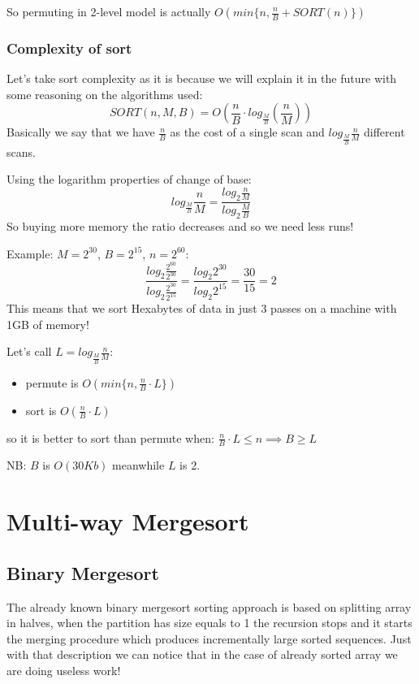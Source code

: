 So permuting in 2-level model is actually $O(min\{n, \frac{n}{B} + SORT(n)\})$

\subsubsection{Complexity of sort}
Let's take sort complexity as it is because we will explain it in the future with some reasoning on the algorithms used:
$$
    SORT(n, M, B) = O\left( \frac{n}{B} \cdot log_{\frac{M}{B}} \left( \frac{n}{M} \right) \right) 
$$
Basically we say that we have $\frac{n}{B}$ as the cost of a single scan and $log_{\frac{M}{B}} \frac{n}{M}$ different scans.

Using the logarithm properties of change of base:
$$
    log_{\frac{M}{B}} \frac{n}{M} = \frac{log_2\frac{n}{M}}{log_2 \frac{M}{B}}
$$
So buying more memory the ratio decreases and so we need less runs!

Example: $M=2^{30}$, $B=2^{15}$, $n=2^{60}$:
$$
    \frac{log_2 \frac{2^{60}}{2^{30}}}{log_2 \frac{2^30}{2^15}} = \frac{log_2 2^{30}}{log_2 2^{15}} = \frac{30}{15} = 2
$$
This means that we sort Hexabytes of data in just 3 passes on a machine with 1GB of memory!

Let's call $L=log_{\frac{M}{B}} \frac{n}{M}$:
\begin{itemize}
    \item permute is $O\left(min\{n, \frac{n}{B} \cdot L \}\right)$
    \item sort is $O\left( \frac{n}{B} \cdot L \right)$
\end{itemize}
so it is better to sort than permute when: $\frac{n}{B} \cdot L \leq n \implies B \geq L$

NB: $B$ is $O(30Kb)$ meanwhile $L$ is 2.

\section{Multi-way Mergesort}
\subsection{Binary Mergesort}
The already known binary mergesort sorting approach is based on splitting array in halves, when the partition has size equals to 1 the recursion stops and it starts the merging procedure which produces incrementally large sorted sequences.
Just with that description we can notice that in the case of already sorted array we are doing useless work!

